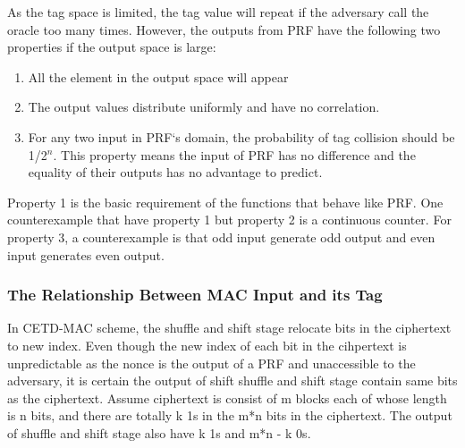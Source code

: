 As the tag space is limited, the tag value will repeat if the adversary call the
oracle too many times. However, the outputs from PRF have the following two
properties if the output space is large:
\begin{enumerate}
	\item All the element in the output space will appear
	\item The output values distribute uniformly and have no correlation. 
	\item For any two input in PRF`s domain, the probability of tag collision should be 1/2$^n$. This property means the input of PRF has no difference and the equality of their outputs has no advantage to predict.
\end{enumerate}
Property 1 is the basic requirement of the functions that behave like PRF. One
counterexample that have property 1 but property 2 is a continuous counter.
For property 3, a counterexample is that odd input generate odd output and even input generates even output.

\subsubsection{The Relationship Between MAC Input and its Tag}
\label{sect:bit-proportion}
In CETD-MAC scheme, the shuffle and shift stage relocate bits in the ciphertext to new index. Even though the new index of each bit in the cihpertext is unpredictable as the nonce is the output of a PRF and unaccessible to the adversary, it is certain the output of shift shuffle and shift stage contain same bits as the ciphertext. Assume ciphertext is consist of m blocks each of whose length is n bits, and there are totally k 1s in the m*n bits in the ciphertext. The output of shuffle and shift stage also have k 1s and m*n - k 0s. 

